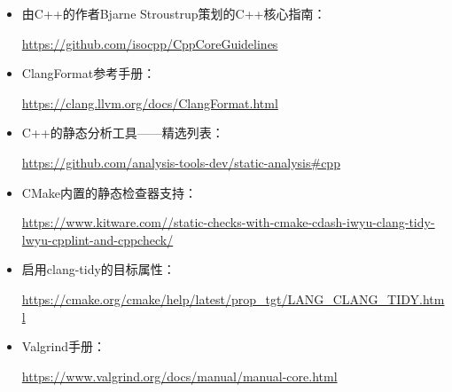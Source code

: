


\begin{itemize}
\item
由C++的作者Bjarne Stroustrup策划的C++核心指南：

\url{https://github.com/isocpp/CppCoreGuidelines}

\item
ClangFormat参考手册：

\url{https://clang.llvm.org/docs/ClangFormat.html}

\item
C++的静态分析工具——精选列表：

\url{https://github.com/analysis-tools-dev/static-analysis#cpp}

\item
CMake内置的静态检查器支持：

\url{https://www.kitware.com//static-checks-with-cmake-cdash-iwyu-clang-tidy-lwyu-cpplint-and-cppcheck/}

\item
启用clang-tidy的目标属性：

\url{https://cmake.org/cmake/help/latest/prop_tgt/LANG_CLANG_TIDY.html}

\item
Valgrind手册：

\url{https://www.valgrind.org/docs/manual/manual-core.html}
\end{itemize}